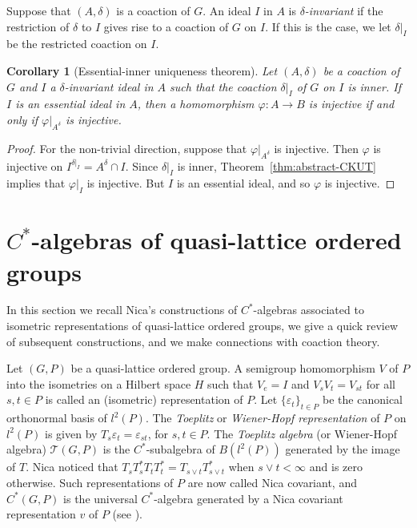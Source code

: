 \documentclass[12pt]{amsart}
\theoremstyle{plain}
\newtheorem{cor}[theorem]{Corollary}
\theoremstyle{remark}
\theoremstyle{definition}
\numberwithin{equation}{section}
\theoremstyle{plain}
\theoremstyle{definition}
\theoremstyle{remark}
\begin{document}
Suppose that $(A, \delta)$ is a coaction of $G$. An ideal $I$ in $A$ is \emph{$\delta$-invariant}
if the restriction of $\delta$ to $I$ gives rise to a coaction of $G$ on $I$. If this is the case,
we let $\delta\vert_I$ be the restricted coaction on $I$.

\begin{cor}[Essential-inner uniqueness theorem]\label{cor:eiut} Let $(A, \delta)$ be a coaction of $G$ and $I$
 a $\delta$-invariant ideal in $A$ such that the coaction $\delta\vert_I$ of $G$ on $I$
is inner. If $I$ is an essential ideal in $A$, then
a homomorphism $\varphi:A\to B$ is injective if and only if $\varphi\vert_{A^\delta}$ is injective.
\end{cor}

\begin{proof} For the non-trivial direction, suppose that $\varphi\vert_{A^\delta}$ is injective.
Then $\varphi$ is injective on $I^{\delta\vert_I}=A^\delta\cap I$. Since $\delta\vert_I$ is inner,
Theorem~\ref{thm:abstract-CKUT} implies that $\varphi\vert_I$ is injective. But $I$
is an essential ideal, and so $\varphi$ is injective.
\end{proof}

\section{$C^*$-algebras of quasi-lattice ordered groups}\label{subsect:Nica-alg-semigp-cp}

In this section we recall Nica's constructions of $C^*$-algebras associated
to isometric representations of quasi-lattice ordered groups, we give a quick review of subsequent constructions, and
we make connections with coaction theory.

Let $(G, P)$ be a quasi-lattice ordered group. A semigroup homomorphism $V$ of $P$ into the isometries on a Hilbert
space $H$ such that $V_e=I$ and $V_sV_t=V_{st}$ for all $s,t\in P$ is called an (isometric) representation of $P$.
Let $\{\varepsilon_t\}_{t\in P}$ be the canonical orthonormal basis of $l^2(P)$.
The \emph{Toeplitz} or \emph{Wiener-Hopf representation} of $P$ on $l^2(P)$ is
given by $T_s\varepsilon_t=\varepsilon_{st}$, for $s,t\in P$. The \emph{Toeplitz algebra}
(or Wiener-Hopf algebra)  ${\mathcal T}(G, P)$ is the $C^*$-subalgebra of $B(l^2(P))$ generated by the image of $T$. Nica
noticed that $T_sT_s^*T_tT_t^*=T_{s\vee t}T_{s\vee t}^*$ when $s\vee t<\infty$ and is zero otherwise. Such
representations of $P$ are now called Nica covariant, and $C^*(G,P)$ is the universal $C^*$-algebra
generated by a Nica covariant representation  $v$ of $P$ (see \cite{N, LacR1}).
\end{document}

